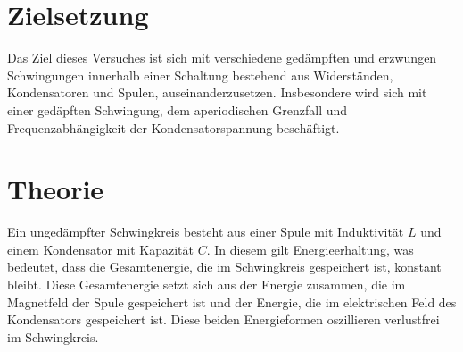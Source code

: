 \section{Zielsetzung}
\label{sec:Zielsetzung}
Das Ziel dieses Versuches ist sich mit verschiedene gedämpften und erzwungen Schwingungen innerhalb einer Schaltung
 bestehend aus Widerständen, Kondensatoren und Spulen, auseinanderzusetzen. Insbesondere wird sich mit einer gedäpften Schwingung, dem aperiodischen 
 Grenzfall und Frequenzabhängigkeit der Kondensatorspannung beschäftigt. 
\section{Theorie}
\label{sec:Theorie}
Ein ungedämpfter Schwingkreis besteht aus einer Spule mit Induktivität $L$ und einem Kondensator mit Kapazität $C$. In diesem gilt Energieerhaltung, was bedeutet, 
dass die Gesamtenergie, die im Schwingkreis gespeichert ist, konstant bleibt. Diese Gesamtenergie setzt sich aus der Energie zusammen, die im Magnetfeld der Spule
gespeichert ist und der Energie, die im elektrischen Feld des Kondensators gespeichert ist. Diese beiden Energieformen oszillieren verlustfrei im Schwingkreis. 

